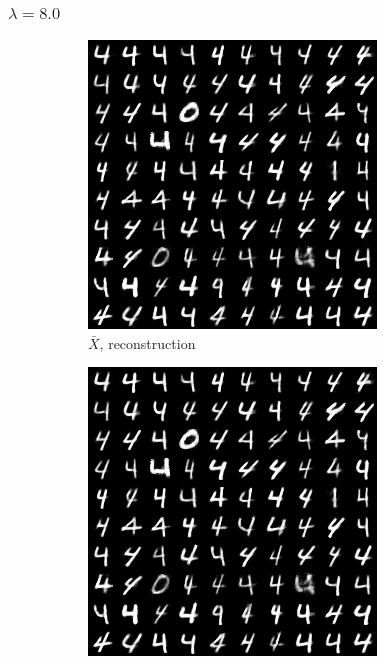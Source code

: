 \documentclass{beamer}
\theoremstyle{plain}
\theoremstyle{definition}
\theoremstyle{remark}
\begin{document}
\begin{frame}
	\frametitle{$\lambda=8.0$}
	\begin{figure}
		\centering
		\begin{subfigure}[b]{0.3\textwidth}
			\centering
			\includegraphics[width=\textwidth]{Images/l21R_8.png}
			\caption{$\bar{X}$, reconstruction}
		\end{subfigure}
		\hfill
		\begin{subfigure}[b]{0.3\textwidth}
			\centering
			\includegraphics[width=\textwidth]{Images/l21L_8.png}

\end{subfigure}
\end{figure}
\end{frame}
\end{document}
